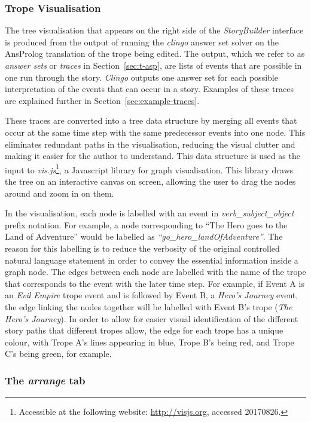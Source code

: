 \documentclass[11pt]{report}
\begin{document}
\subsubsection{Trope Visualisation}
\label{sec:trope-visualisation}
The tree visualisation that appears on the right side of the \emph{StoryBuilder}
interface is produced from the output of running the \emph{clingo} answer set
solver on the AnsProlog translation of the trope being edited. The output,
which we refer to as \emph{answer sets} or \emph{traces} in Section~\ref{sec:t-asp}, are lists of events that are possible in one run
through the story. \emph{Clingo} outputs one answer set for each possible
interpretation of the events that can occur in a story. Examples of these traces
are explained further in Section~\ref{sec:example-traces}.

These traces are converted into a tree data structure by merging all events that
occur at the same time step with the same predecessor events into one node. This
eliminates redundant paths in the visualisation, reducing the visual clutter and
making it easier for the author to understand. This data structure is used as
the input to \emph{vis.js}\footnote{Accessible at the following website:
  \url{http://visjs.org}, accessed 20170826.}, a Javascript library for graph visualisation. This
library draws the tree on an interactive canvas on screen, allowing the user to
drag the nodes around and zoom in on them.

In the visualisation, each node is labelled with an event in
\emph{verb_subject_object} prefix notation. For example, a node corresponding to
``The Hero goes to the Land of Adventure'' would be labelled as
\emph{``go_hero_landOfAdventure''}. The reason for this labelling is to reduce
the verbosity of the original controlled natural language statement in order to
convey the essential information inside a graph node. The edges between
each node are labelled with the name of the trope that corresponds to the event with the
later time step. For example, if
Event A is an \emph{Evil Empire} trope event and is followed by Event B, a
\emph{Hero's Journey} event, the edge linking the nodes together will be
labelled with Event B's trope (\emph{The Hero's Journey}). In order to allow for
easier visual identification of the different story paths that different tropes
allow, the edge for each trope has a unique colour, with Trope A's lines
appearing in blue, Trope B's being red, and Trope C's being green, for example.

\subsubsection{The \emph{arrange} tab}
\end{document}
